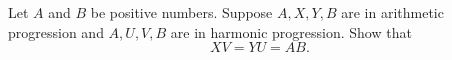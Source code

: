 Let $A$ and $B$ be positive numbers. Suppose $A,X,Y,B$ are in arithmetic progression and $A,U,V,B$ are in harmonic progression. Show that
\[
XV=YU=AB .
\]
